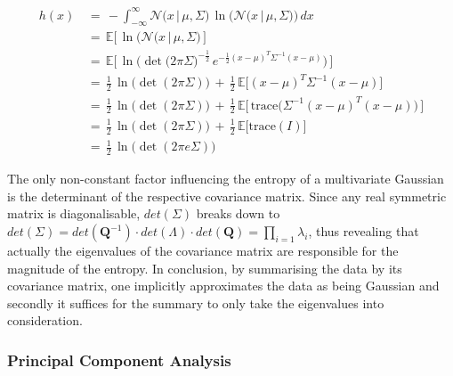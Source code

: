 \documentclass[a4paper, 11pt]{article}
\begin{document}
\begin{align*}
h(x)\, &=\, - \int_{-\infty}^{\infty} \mathcal{N}\big(x\, |\, \mu, \Sigma\big)\, \ln\big(\mathcal{N}\big(x\, |\, \mu, \Sigma\big)\big)\, dx \\
& =\, \mathbb{E}\big[\,\ln(\mathcal{N}\big(x\,|\, \mu, \Sigma\big)\,\big] \\
& =\, \mathbb{E}\big [\, \ln\big(\det\big(2\pi\Sigma\big)^{-\frac{1}{2}}\, e^{-\frac{1}{2}(x-\mu)^T\Sigma^{-1}(x-\mu)}\big)\, \big] \\
& =\, \frac{1}{2}\, \ln\big(\det(2\pi\Sigma)\big)\, +\, \frac{1}{2}\, \mathbb{E}\big [(x-\mu)^T \Sigma^{-1}(x-\mu)\big]\\
& =\, \frac{1}{2}\, \ln\big(\det(2\pi\Sigma)\big)\, +\, \frac{1}{2}\, \mathbb{E}\big[\, \mathrm{trace}\big(\Sigma^{-1}(x-\mu)^T (x-\mu)\big)\,\big]\\
& =\, \frac{1}{2}\, \ln\big(\det(2\pi\Sigma)\big)\, +\, \frac{1}{2}\, \mathbb{E}\big[\mathrm{trace}(I)\big]\\
& =\, \frac{1}{2}\, \ln\big(\det(2\pi e \Sigma)\big)
\end{align*}

The only non-constant factor influencing the entropy of a multivariate Gaussian is the determinant of the respective covariance matrix.
Since any real symmetric matrix is diagonalisable, $det(\Sigma)$ breaks down to $det(\Sigma) = det(\mathbf{Q}^{-1}) \cdot det(\Lambda)\cdot det(\mathbf{Q}) = \prod_{i = 1} \lambda_{i}$, thus revealing that actually the eigenvalues of the covariance matrix are responsible for the magnitude of the entropy. In conclusion, by summarising the data by its covariance matrix, one implicitly approximates the data as being Gaussian and secondly it suffices for the summary to only take the eigenvalues into consideration.

\subsubsection{Principal Component Analysis}
\end{document}
